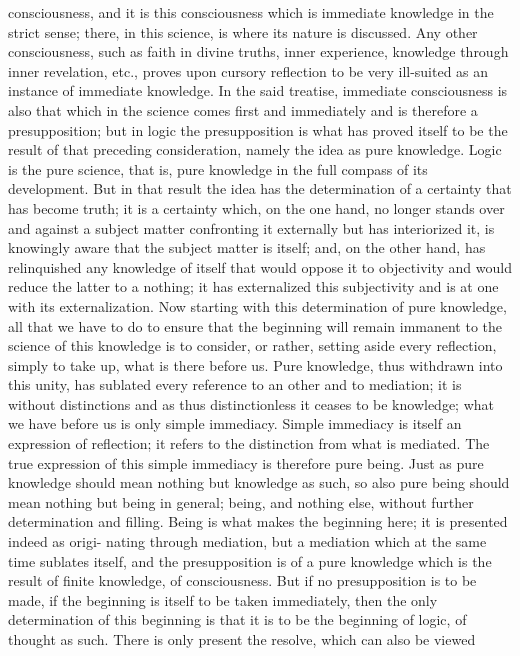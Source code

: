 consciousness, and it is this consciousness which is immediate knowledge
in the strict sense; there, in this science, is where its nature is discussed.
Any other consciousness, such as faith in divine truths, inner experience,
knowledge through inner revelation, etc., proves upon cursory reflection
to be very ill-suited as an instance of immediate knowledge. In the said
treatise, immediate consciousness is also that which in the science comes
first and immediately and is therefore a presupposition; but in logic the
presupposition is what has proved itself to be the result of that preceding
consideration, namely the idea as pure knowledge. Logic is the pure science,
that is, pure knowledge in the full compass of its development. But in
that result the idea has the determination of a certainty that has become
truth; it is a certainty which, on the one hand, no longer stands over and
against a subject matter confronting it externally but has interiorized it, is
knowingly aware that the subject matter is itself; and, on the other hand,
has relinquished any knowledge of itself that would oppose it to objectivity
and would reduce the latter to a nothing; it has externalized this subjectivity
and is at one with its externalization.
Now starting with this determination of pure knowledge, all that we have
to do to ensure that the beginning will remain immanent to the science
of this knowledge is to consider, or rather, setting aside every reflection,
simply to take up, what is there before us.
Pure knowledge, thus withdrawn into this unity, has sublated every
reference to an other and to mediation; it is without distinctions and as
thus distinctionless it ceases to be knowledge; what we have before us is
only simple immediacy.
Simple immediacy is itself an expression of reflection; it refers to the
distinction from what is mediated. The true expression of this simple
immediacy is therefore pure being. Just as pure knowledge should mean
nothing but knowledge as such, so also pure being should mean nothing
but being in general; being, and nothing else, without further determination
and filling.
Being is what makes the beginning here; it is presented indeed as origi-
nating through mediation, but a mediation which at the same time sublates
itself, and the presupposition is of a pure knowledge which is the result
of finite knowledge, of consciousness. But if no presupposition is to be
made, if the beginning is itself to be taken immediately, then the only
determination of this beginning is that it is to be the beginning of logic, of
thought as such. There is only present the resolve, which can also be viewed
